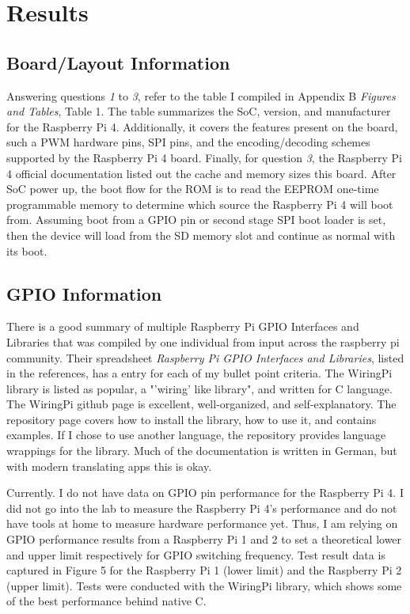 \documentclass[journal]{IEEEtran}
\begin{document}
    \section{Results}
    \subsection{Board/Layout Information}
    Answering questions \emph{1} to \emph{3}, refer to the table I compiled in Appendix B \emph{Figures and Tables}, Table 1. 
    The table summarizes the SoC, version, and manufacturer for the Raspberry Pi 4.
    Additionally, it covers the features present on the board, such a PWM hardware pins, SPI pins, and the encoding/decoding schemes supported by the Raspberry Pi 4 board.
    Finally, for question \emph{3}, the Raspberry Pi 4 official documentation listed out the cache and memory sizes this board.
    After SoC power up, the boot flow for the ROM is to read the EEPROM one-time programmable memory to determine which source the Raspberry Pi 4 will boot from.
    Assuming boot from a GPIO pin or second stage SPI boot loader is set, then the device will load from the SD memory slot and continue as normal with its boot. 

    \subsection{GPIO Information}
    There is a good summary of multiple Raspberry Pi GPIO Interfaces and Libraries that was compiled by one individual from input across the raspberry pi community.
    Their spreadsheet \emph{Raspberry Pi GPIO Interfaces and Libraries}, listed in the references, has a entry for each of my bullet point criteria.
    The WiringPi library is listed as popular, a "'wiring' like library", and written for C language.
    The WiringPi github page is excellent, well-organized, and self-explanatory.
    The repository page covers how to install the library, how to use it, and contains examples. 
    If I chose to use another language, the repository provides language wrappings for the library.
    Much of the documentation is written in German, but with modern translating apps this is okay.

    Currently. I do not have data on GPIO pin performance for the Raspberry Pi 4. 
    I did not go into the lab to measure the Raspberry Pi 4's performance and do not have tools at home to measure hardware performance yet.
    Thus, I am relying on GPIO performance results from a Raspberry Pi 1 and 2 to set a theoretical lower and upper limit respectively for GPIO switching frequency. 
    Test result data is captured in Figure 5 for the Raspberry Pi 1 (lower limit) and the Raspberry Pi 2 (upper limit).
    Tests were conducted with the WiringPi library, which shows some of the best performance behind native C.
\end{document}
